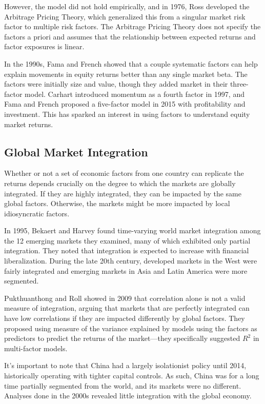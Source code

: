However, the model did not hold empirically, and in 1976, Ross developed the Arbitrage Pricing Theory, which generalized this from a singular market risk factor to multiple risk factors.\cite{ross} The Arbitrage Pricing Theory does not specify the factors a priori and assumes that the relationship between expected returns and factor exposures is linear.

In the 1990s, Fama and French showed that a couple systematic factors can help explain movements in equity returns better than any single market beta.\cite{fama_french1992} The factors were initially size and value, though they added market in their three-factor model. Carhart introduced momentum as a fourth factor in 1997, and Fama and French proposed a five-factor model in 2015 with profitability and investment.\cite{carhart, fama_french2015} This has sparked an interest in using factors to understand equity market returns.

\subsection{Global Market Integration}

Whether or not a set of economic factors from one country can replicate the returns depends crucially on the degree to which the markets are globally integrated. If they are highly integrated, they can be impacted by the same global factors. Otherwise, the markets might be more impacted by local idiosyncratic factors.

In 1995, Bekaert and Harvey found time-varying world market integration among the 12 emerging markets they examined, many of which exhibited only partial integration.\cite{bekaert} They noted that integration is expected to increase with financial liberalization. During the late 20th century, developed markets in the West were fairly integrated and emerging markets in Asia and Latin America were more segmented.

Pukthuanthong and Roll showed in 2009 that correlation alone is not a valid measure of integration, arguing that markets that are perfectly integrated can have low correlations if they are impacted differently by global factors.\cite{pukthuanthong} They proposed using measure of the variance explained by models using the factors as predictors to predict the returns of the market—they specifically suggested $R^2$ in multi-factor models.\cite{pukthuanthong}

It's important to note that China had a largely isolationist policy until 2014, historically operating with tighter capital controls. As such, China was for a long time partially segmented from the world, and its markets were no different. Analyses done in the 2000s revealed little integration with the global economy.

